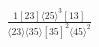 \documentclass[varwidth, border=5pt]{standalone}
\begin{document}
\begin{my}
$\begin{gathered}
\scriptscriptstyle\frac{1[23]⟨25⟩^3[13]}{⟨23⟩⟨35⟩[35]^2⟨45⟩^2}
\end{gathered}$
\end{my}
\end{document}

